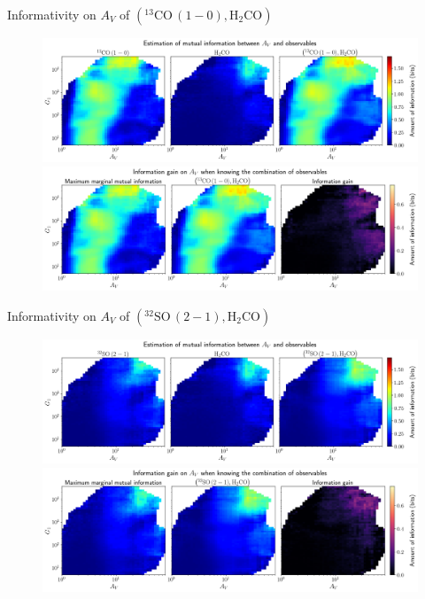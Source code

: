 \documentclass{beamer}
\begin{document}
\begin{frame}{Informativity on $A_V$ of $\left(\mathrm{^{13}CO\,(1-0)},\mathrm{H_2CO}\right)$}
    \begin{figure}
        \centering
        \includegraphics[width=0.95\linewidth]{../mi/av__13co10_h2co_mi.png}
        \vfill
        \includegraphics[width=0.95\linewidth]{../mi/av__13co10_h2co_mi_gain.png}
    \end{figure}
\end{frame}

\begin{frame}{Informativity on $A_V$ of $\left(\mathrm{^{32}SO\,(2-1)},\mathrm{H_2CO}\right)$}
    \begin{figure}
        \centering
        \includegraphics[width=0.95\linewidth]{../mi/av__32so21_h2co_mi.png}
        \vfill
        \includegraphics[width=0.95\linewidth]{../mi/av__32so21_h2co_mi_gain.png}
    \end{figure}
\end{frame}
\end{document}
